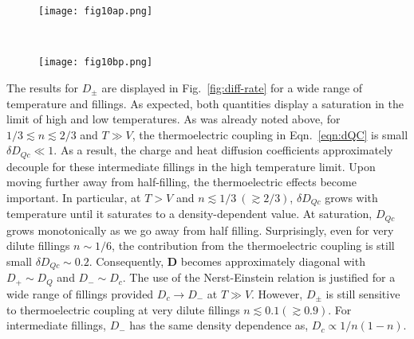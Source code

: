 \documentclass[aps,prx,onecolumn,amsmath,nofootinbib,amssymb,11pt]{revtex4-1}
\begin{document}
{\begin{appendix}
\captionsetup[figure]{justification=centerlast}
 \begin{figure*}[t!]
    \centering
        \begin{subfigure}{0.49\textwidth}
            \centering
            \texttt{[image: fig10ap.png]}
            
        \end{subfigure}
        ~
        \begin{subfigure}{0.49\textwidth}  
            \centering 
            \texttt{[image: fig10bp.png]}
          
        \end{subfigure}
       
     \caption{\textsf{Inverse eigenvalues of the diffusion matrix. Numerical errors prevent the accurate determination of these diffusion constants for dilute fillings and for low temperatures deep in the correlated regime. }}%
    \label{fig:diff-rate}%
\end{figure*}

The results for $D_{\pm}$ are displayed in Fig.~\ref{fig:diff-rate} for a wide range of temperature and fillings. As expected, both quantities display a saturation in the limit of high and low temperatures. As was already noted above, for $1/3 \lesssim n \lesssim 2/3 $ and $T\gg V$, the thermoelectric coupling in Eqn.~\ref{eqn:dQC} is small $\delta D_{Qc}\ll 1$. As a result, the charge and heat diffusion coefficients approximately decouple for these intermediate fillings in the high temperature limit. Upon moving further away from half-filling, the thermoelectric effects become important. In particular, at $T > V$ and $n\lesssim 1/3~ (\gtrsim 2/3)$, $\delta D_{Qc}$ grows with temperature until it saturates to a density-dependent value. At saturation, $D_{Qc}$ grows monotonically as we go away from half filling. Surprisingly, even for very dilute fillings $n\sim 1/6$, the contribution from the thermoelectric coupling is still small $\delta D_{Qc} \sim 0.2$. Consequently, $\mathbf{D}$ becomes approximately diagonal with $D_+ \sim D_Q$ and $D_- \sim D_c$. The use of the Nerst-Einstein relation is justified for a wide range of fillings provided $D_c \rightarrow D_-$ at $T\gg V$. However, $D_{\pm}$ is still sensitive to thermoelectric coupling at very dilute fillings $n\lesssim 0.1 (\gtrsim 0.9)$. For intermediate fillings, $D_-$ has the same density dependence as, $D_{c}\propto 1/n(1-n)$. 



\end{appendix}}
\end{document}
